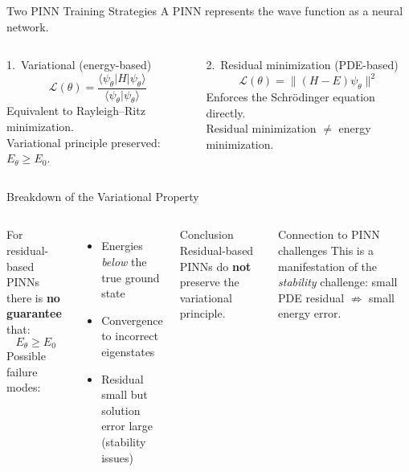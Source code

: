 \documentclass[aspectratio=169,10pt]{beamer}
\begin{document}
\begin{frame}{Two PINN Training Strategies}
  A PINN represents the wave function as a neural network.
  \vspace{0.3cm}
  \begin{columns}[T]
      \begin{block}{1.\ Variational (energy-based)}
        \[
          \mathcal{L}(\theta)
          = \frac{\langle\psi_\theta|H|\psi_\theta\rangle}
                 {\langle\psi_\theta|\psi_\theta\rangle}
        \]
        Equivalent to Rayleigh--Ritz minimization.\\
        \alert{Variational principle preserved:}
        $E_\theta \geq E_0$.
      \end{block}
      \begin{alertblock}{2.\ Residual minimization (PDE-based)}
        \[
          \mathcal{L}(\theta)
          = \bigl\|(H-E)\psi_\theta\bigr\|^2
        \]
        Enforces the Schr\"{o}dinger equation directly.\\
        Residual minimization $\neq$ energy minimization.
      \end{alertblock}
  \end{columns}
\end{frame}

\begin{frame}{Breakdown of the Variational Property}
  \begin{columns}[T]
      For residual-based PINNs there is \textbf{no guarantee} that:
      \[
        E_\theta \geq E_0
      \]
      Possible failure modes:
      \begin{itemize}
        \item Energies \emph{below} the true ground state
        \item Convergence to incorrect eigenstates
        \item Residual small but solution error large
              (stability issues)
      \end{itemize}
      \begin{alertblock}{Conclusion}
        Residual-based PINNs do \textbf{not} preserve the variational
        principle.
      \end{alertblock}
      \vspace{0.3cm}
      \begin{block}{Connection to PINN challenges}
        This is a manifestation of the \emph{stability} challenge:
        small PDE residual $\not\Rightarrow$ small energy error.
      \end{block}
  \end{columns}
\end{frame}
\end{document}

